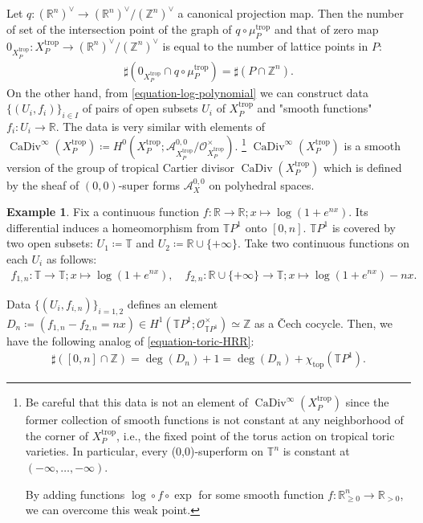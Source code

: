 \documentclass[a4paper,dvipdfmx,reqno,12pt]{amsart}
\theoremstyle{definition}
\newtheorem{example}[theorem]{Example}
\newcommand{\deq}{\coloneqq}
\newcommand{\Z}{\mathbb{Z}}%
\newcommand{\mb}[1]{\mathbb{#1}}%
\newcommand{\mcal}[1]{\mathcal{#1}}%
\newcommand{\opn}[1]{\operatorname{#1}}
\newcommand{\myfootnote}[1]{\hspace{-5pt}\footnote{#1}}
\numberwithin{equation}{section}
\begin{document}
Let 
$q: ({\mathbb{R}}^{n})^{\vee}\to ({\mathbb{R}}^{n})^{\vee}/(\Z^{n})^{\vee}$ 
a canonical projection map.
Then the number of set of the intersection point of 
the graph of $q\circ \mu_P^{\opn{trop}}$ and 
that of zero map 
$0_{X_P^{\opn{trop}}}\colon X_P^{\opn{trop}} \to
({\mathbb{R}}^{n})^{\vee}/(\Z^{n})^{\vee}$ is equal to the 
number of lattice points in $P$:
\begin{align}
\label{equation-moment-map-intersection}
\sharp (0_{X_P^{\opn{trop}}}\cap q\circ\mu_P^{\opn{trop}})
=\sharp (P \cap \Z^{n}).
\end{align}
On the other hand, from \cref{equation-log-polynomial} 
we can construct data $\{(U_i,f_i)\}_{i\in I}$ of 
pairs of open subsets 
$U_i$ of $X_{P}^{\opn{trop}}$ and 
"smooth functions" $f_i\colon U_i \to \mathbb{R}$. 
The data is very similar with elements of 
$\opn{CaDiv}^{\infty}(X_{P}^{\opn{trop}})\deq H^{0}(X_{P}^{\opn{trop}};
\mcal{A}^{0,0}_{X_{P}^{\opn{trop}}}/
\mathcal{O}^{\times}_{X_{P}^{\opn{trop}}})$.
\myfootnote{
Be careful that this data is not an element
of $\opn{CaDiv}^{\infty}(X_{P}^{\opn{trop}})$ since
 the former collection of smooth functions is not constant
at any neighborhood of the corner of $X_{P}^{\opn{trop}}$,
i.e., the fixed point of the torus action on tropical 
toric varieties.
In particular, every (0,0)-superform on 
$\mathbb{T}^n$ is constant at 
$(-\infty,\ldots,-\infty)$.

By adding functions 
$\opn{log}\circ f \circ\opn{exp}$ for some smooth function
$f\colon \mathbb{R}_{\geq 0}^{n}\to \mathbb{R}_{>0}$,
we can overcome this weak point.
}
$\opn{CaDiv}^{\infty}(X_{P}^{\opn{trop}})$ is a
smooth version of the group of tropical Cartier divisor
$\opn{CaDiv}(X_{P}^{\opn{trop}})$ 
\cite[Definition 4.2]{MR3894860}
which is defined by the sheaf of $(0,0)$-super forms 
$\mcal{A}^{0,0}_X$ on 
polyhedral spaces.
\begin{example} \label{eg: TP1Cartier}
Fix a continuous function $f\colon \mathbb{R}\to \mathbb{R}; 
x\mapsto \opn{log}(1+e^{nx})$.
Its differential induces a homeomorphism 
from $\mathbb{T}P^1$ onto $[0,n]$. 
$\mathbb{T}P^{1}$ is covered by two open subsets:
$U_1\deq \mathbb{T}$ and $U_2\deq \mb{R}\cup\{+\infty\}$.
Take two continuous functions on each $U_i$ as follows:
\begin{align}
f_{1,n}\colon \mathbb{T}\to \mathbb{T};
x \mapsto \log (1+e^{nx}),\quad
f_{2,n}\colon \mb{R}\cup\{+\infty\} \to 
\mathbb{T};
x\mapsto \log(1+e^{nx})-nx.
\end{align}

Data $\{(U_i,f_{i,n})\}_{i=1,2}$ defines an element 
$D_n\deq (f_{1,n}-f_{2,n}=nx)\in 
H^{1}(\mb{T}P^1;\mcal{O}_{\mb{T}P^1}^{\times})\simeq \Z$
as a \v{C}ech cocycle.
Then, we have the following analog of 
\cref{equation-toric-HRR}:
\begin{align}
\label{equation-MRR-tropical-line}
\sharp([0,n]\cap \Z)=\opn{deg}(D_n)+1=
\opn{deg}(D_n)+\chi_{\opn{top}}(\mb{T}P^1).
\end{align}
\end{example}
\end{document}
